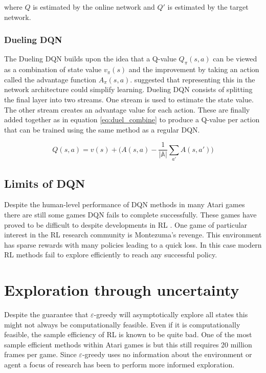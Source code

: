 where $Q$ is estimated by the online network and $Q'$ is estimated by the target network.

\subsubsection{Dueling DQN}

The Dueling DQN builds upon the idea that a Q-value $Q_\pi(s,a)$ can be viewed as a combination of state value $v_\pi(s)$ and the improvement by taking an action called the advantage function $A_\pi(s,a)$. \cite{wang_2015} suggested that representing this in the network architecture could simplify learning. Dueling DQN consists of splitting the final layer into two streams. One stream is used to estimate the state value. The other stream creates an advantage value for each action. These are finally added together as in equation \ref{eq:duel_combine} to produce a Q-value per action that can be trained using the same method as a regular DQN.

\begin{equation}
    \label{eq:duel_combine}
    Q(s, a) = v(s) + \bigg(A(s,a)-\frac{1}{|\mathbb{A}|}\sum_{a'} A(s,a')\bigg)
\end{equation}

\subsection{Limits of DQN}

Despite the human-level performance of DQN methods in many Atari games \citep{mnih_2015} there are still some games DQN fails to complete successfully. These games have proved to be difficult to despite developments in RL \citep{mnih_2016, schulman_2017, hessel_2017}. One game of particular interest in the RL research community is Montezuma's revenge. This environment has sparse rewards with many policies leading to a quick loss. In this case modern RL methods fail to explore efficiently to reach any successful policy.

\section{Exploration through uncertainty}

Despite the guarantee that $\varepsilon$-greedy will asymptotically explore all states this might not always be computationally feasible. Even if it is computationally feasible, the sample efficiency of RL is known to be quite bad. One of the most sample efficient methods within Atari games is \cite{hessel_2017} but this still requires 20 million frames per game. Since $\varepsilon$-greedy uses no information about the environment or agent a focus of research has been to perform more informed exploration. 


